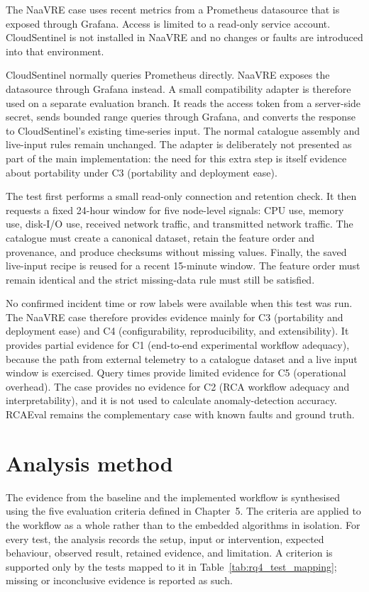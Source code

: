 The NaaVRE case uses recent metrics from a Prometheus datasource that is exposed through Grafana. Access is limited to a read-only service account. CloudSentinel is not installed in NaaVRE and no changes or faults are introduced into that environment.

CloudSentinel normally queries Prometheus directly. NaaVRE exposes the datasource through Grafana instead. A small compatibility adapter is therefore used on a separate evaluation branch. It reads the access token from a server-side secret, sends bounded range queries through Grafana, and converts the response to CloudSentinel's existing time-series input. The normal catalogue assembly and live-input rules remain unchanged. The adapter is deliberately not presented as part of the main implementation: the need for this extra step is itself evidence about portability under C3 (portability and deployment ease).

The test first performs a small read-only connection and retention check. It then requests a fixed 24-hour window for five node-level signals: CPU use, memory use, disk-I/O use, received network traffic, and transmitted network traffic. The catalogue must create a canonical dataset, retain the feature order and provenance, and produce checksums without missing values. Finally, the saved live-input recipe is reused for a recent 15-minute window. The feature order must remain identical and the strict missing-data rule must still be satisfied.

No confirmed incident time or row labels were available when this test was run. The NaaVRE case therefore provides evidence mainly for C3 (portability and deployment ease) and C4 (configurability, reproducibility, and extensibility). It provides partial evidence for C1 (end-to-end experimental workflow adequacy), because the path from external telemetry to a catalogue dataset and a live input window is exercised. Query times provide limited evidence for C5 (operational overhead). The case provides no evidence for C2 (RCA workflow adequacy and interpretability), and it is not used to calculate anomaly-detection accuracy. RCAEval remains the complementary case with known faults and ground truth.

\section{Analysis method}
The evidence from the baseline and the implemented workflow is synthesised using the five evaluation criteria defined in Chapter~5. The criteria are applied to the workflow as a whole rather than to the embedded algorithms in isolation. For every test, the analysis records the setup, input or intervention, expected behaviour, observed result, retained evidence, and limitation. A criterion is supported only by the tests mapped to it in Table~\ref{tab:rq4_test_mapping}; missing or inconclusive evidence is reported as such.

